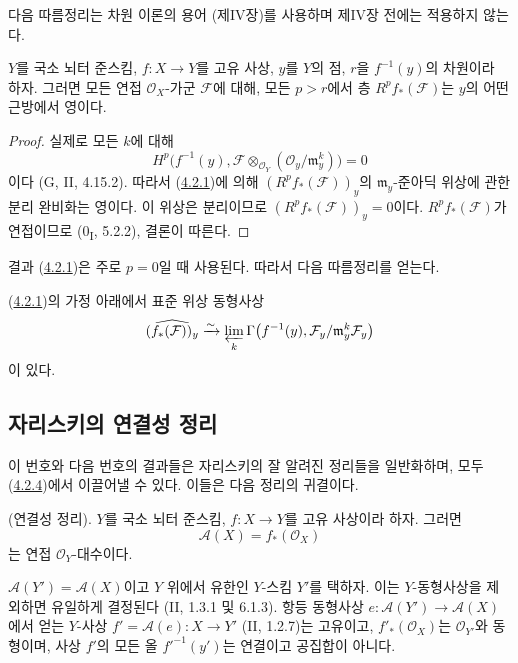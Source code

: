 다음 따름정리는 차원 이론의 용어 (제IV장)를 사용하며 제IV장 전에는
적용하지 않는다.

\begin{corollary}[4.2.2]
\label{III.4.2.2-fr}
$Y$를 국소 뇌터 준스킴, $f:X\to Y$를 고유 사상, $y$를 $Y$의 점,
$r$을 $f^{-1}(y)$의 차원이라 하자. 그러면 모든 연접
$\mathcal O_X$-가군 $\mathcal F$에 대해, 모든 $p>r$에서 층
$R^pf_*(\mathcal F)$는 $y$의 어떤 근방에서 영이다.
\end{corollary}

\begin{proof}
실제로 모든 $k$에 대해
\[
H^p\bigl(f^{-1}(y),
\mathcal F\otimes_{\mathcal O_Y}(\mathcal O_y/\mathfrak m_y^k)\bigr)=0
\]
이다 (G, II, 4.15.2). 따라서
(\hyperref[III.4.2.1-fr]{4.2.1})에 의해
$(R^pf_*(\mathcal F))_y$의 $\mathfrak m_y$-준아딕 위상에 관한 분리
완비화는 영이다. 이 위상은 분리이므로
$(R^pf_*(\mathcal F))_y=0$이다. $R^pf_*(\mathcal F)$가 연접이므로
(0\textsubscript{I}, 5.2.2), 결론이 따른다.
\end{proof}

\begin{env}[4.2.3]
\label{III.4.2.3-fr}
결과 (\hyperref[III.4.2.1-fr]{4.2.1})은 주로 $p=0$일 때 사용된다.
따라서 다음 따름정리를 얻는다.
\end{env}

\begin{corollary}[4.2.4]
\label{III.4.2.4-fr}
(\hyperref[III.4.2.1-fr]{4.2.1})의 가정 아래에서 표준 위상 동형사상
\[
\widehat{(f_*(\mathcal F))_y}
\xrightarrow{\sim}
\varprojlim_k\Gamma\bigl(f^{-1}(y),
\mathcal F_y/\mathfrak m_y^k\mathcal F_y\bigr)
\]
이 있다.
\end{corollary}

\subsection{자리스키의 연결성 정리}
\label{subsection:III.4.3-fr}
\label{III.4.3-fr}

이 번호와 다음 번호의 결과들은 자리스키의 잘 알려진 정리들을
일반화하며, 모두 (\hyperref[III.4.2.4-fr]{4.2.4})에서 이끌어낼 수 있다.
이들은 다음 정리의 귀결이다.

\begin{theorem}[4.3.1]
\label{III.4.3.1-fr}
\textnormal{(연결성 정리).}
$Y$를 국소 뇌터 준스킴, $f:X\to Y$를 고유 사상이라 하자. 그러면
\[
\mathcal A(X)=f_*(\mathcal O_X)
\]
는 연접 $\mathcal O_Y$-대수이다.


$\mathcal A(Y')=\mathcal A(X)$이고 $Y$ 위에서 유한인 $Y$-스킴
$Y'$를 택하자. 이는 $Y$-동형사상을 제외하면 유일하게 결정된다
(II, 1.3.1 및 6.1.3). 항등 동형사상
$e:\mathcal A(Y')\to\mathcal A(X)$에서 얻는 $Y$-사상
$f'=\mathcal A(e):X\to Y'$ (II, 1.2.7)는 고유이고,
$f'_*(\mathcal O_X)$는 $\mathcal O_{Y'}$와 동형이며, 사상 $f'$의
모든 올 $f'^{-1}(y')$는 연결이고 공집합이 아니다.
\end{theorem}

